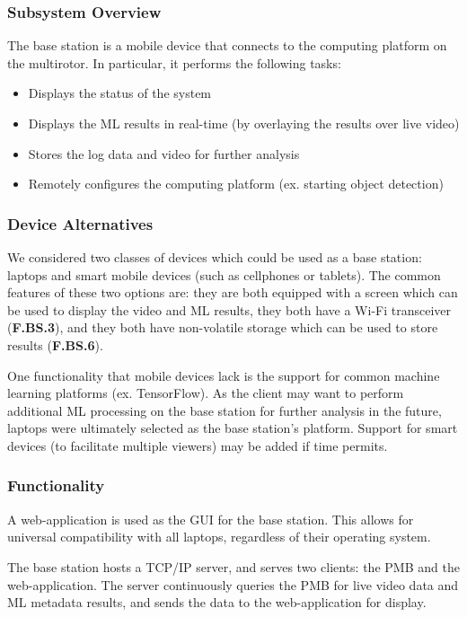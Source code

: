 \subsubsection{Subsystem Overview}

The base station is a mobile device that connects to the computing platform on the multirotor. In particular, it performs the following tasks:
\begin{itemize}
    \item Displays the status of the system
    \item Displays the ML results in real-time (by overlaying the results over live video)
    \item Stores the log data and video for further analysis
    \item Remotely configures the computing platform (ex. starting object detection)
\end{itemize}

\subsubsection{Device Alternatives}
We considered two classes of devices which could be used as a base station: laptops and smart mobile devices (such as cellphones or tablets). The common features of these two options are: they are both equipped with a screen which can be used to display the video and ML results, they both have a Wi-Fi transceiver (\textbf{F.BS.3}), and they both have non-volatile storage which can be used to store results (\textbf{F.BS.6}).

One functionality that mobile devices lack is the support for common machine learning platforms (ex. TensorFlow). As the client may want to perform additional ML processing on the base station for further analysis in the future, laptops were ultimately selected as the base station's platform. Support for smart devices (to facilitate multiple viewers) may be added if time permits.

\subsubsection{Functionality}
A web-application is used as the GUI for the base station. This allows for universal compatibility with all laptops, regardless of their operating system.

The base station hosts a TCP/IP server, and serves two clients: the PMB and the web-application. The server continuously queries the PMB for live video data and ML metadata results, and sends the data to the web-application for display.

